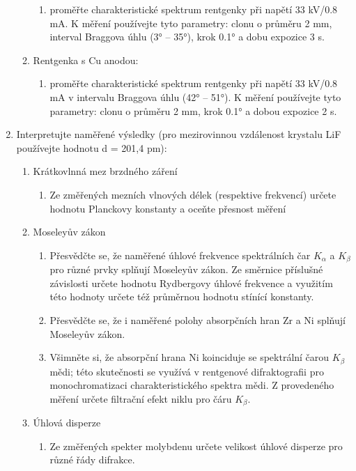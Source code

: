 \documentclass[10pt,a4paper]{article}
\newcommand{\°}{\degree}
\begin{document}
\begin{enumerate}
\begin{enumerate}
        \begin{enumerate}
            \item proměřte charakteristické spektrum rentgenky při napětí 33 kV/0.8 mA. K měření používejte tyto parametry: clonu o průměru 2  mm, interval Braggova úhlu (3° – 35°), krok 0.1° a dobu expozice 3 s.
        \end{enumerate}
        \item Rentgenka s Cu anodou:
        \begin{enumerate}
            \item proměřte charakteristické spektrum rentgenky při napětí 33 kV/0.8 mA v intervalu Braggova úhlu (42° – 51°). K měření používejte tyto parametry: clonu o průměru 2 mm, krok 0.1° a dobou expozice 2 s.
        \end{enumerate}
    \end{enumerate}
    \item Interpretujte naměřené výsledky (pro mezirovinnou vzdálenost krystalu LiF používejte hodnotu d = 201,4 pm):
    \begin{enumerate}
        \item Krátkovlnná mez brzdného záření
        \begin{enumerate}
            \item Ze změřených mezních vlnových délek (respektive frekvencí) určete hodnotu Planckovy konstanty a oceňte přesnost měření
        \end{enumerate}
        \item Moseleyův zákon
        \begin{enumerate}
            \item Přesvědčte se, že naměřené úhlové frekvence spektrálních čar $K_\alpha$ a $K_\beta$ pro různé prvky splňují Moseleyův zákon. Ze směrnice příslušné závislosti určete hodnotu Rydbergovy úhlové frekvence a využitím této hodnoty určete též průměrnou hodnotu stínící konstanty.
            \item Přesvědčte se, že i naměřené polohy absorpčních hran Zr a Ni splňují Moseleyův zákon.
            \item Všimněte si, že absorpční hrana Ni koinciduje se spektrální čarou $K_\beta$ mědi; této skutečnosti se využívá v rentgenové difraktografii pro monochromatizaci charakteristického spektra mědi. Z provedeného měření určete filtrační efekt niklu pro čáru $K_\beta$.
        \end{enumerate}
        \item Úhlová disperze
        \begin{enumerate}
            \item Ze změřených spekter molybdenu určete velikost úhlové disperze pro různé řády difrakce.
        \end{enumerate}
    \end{enumerate}
\end{enumerate}
\end{document}
